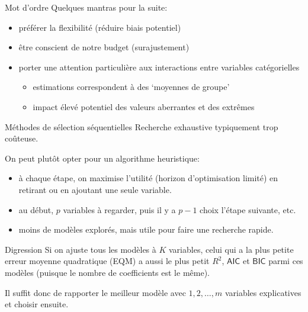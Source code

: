 \documentclass[
  ignorenonframetext,
]{beamer}
\providecommand{\tightlist}{%
  \setlength{\itemsep}{0pt}\setlength{\parskip}{0pt}}\usepackage{longtable,booktabs,array}
\begin{document}
\begin{frame}{Mot d'ordre}
\label{mot-dordre}
Quelques mantras pour la suite:

\begin{itemize}
\tightlist
\item
  préférer la flexibilité (réduire biais potentiel)
\item
  être conscient de notre budget (surajustement)
\item
  porter une attention particulière aux interactions entre variables
  catégorielles

  \begin{itemize}
  \tightlist
  \item
    estimations correspondent à des `moyennes de groupe'
  \item
    impact élevé potentiel des valeurs aberrantes et des extrêmes
  \end{itemize}
\end{itemize}
\end{frame}

\begin{frame}{Méthodes de sélection séquentielles}
\label{muxe9thodes-de-suxe9lection-suxe9quentielles}
Recherche exhaustive typiquement trop coûteuse.

On peut plutôt opter pour un algorithme heuristique:

\begin{itemize}
\tightlist
\item
  à chaque étape, on maximise l'utilité (horizon d'optimisation limité)
  en retirant ou en ajoutant une seule variable.
\item
  au début, \(p\) variables à regarder, puis il y a \(p-1\) choix
  l'étape suivante, etc.
\item
  moins de modèles explorés, mais utile pour faire une recherche rapide.
\end{itemize}
\end{frame}

\begin{frame}{Digression}
\label{digression}
Si on ajuste tous les modèles à \(K\) variables, celui qui a la plus
petite erreur moyenne quadratique (EQM) a aussi le plus petit \(R^2\),
\(\mathsf{AIC}\) et \(\mathsf{BIC}\) parmi ces modèles (puisque le
nombre de coefficients est le même).

Il suffit donc de rapporter le meilleur modèle avec \(1,2,\ldots, m\)
variables explicatives et choisir ensuite.
\end{frame}
\end{document}
